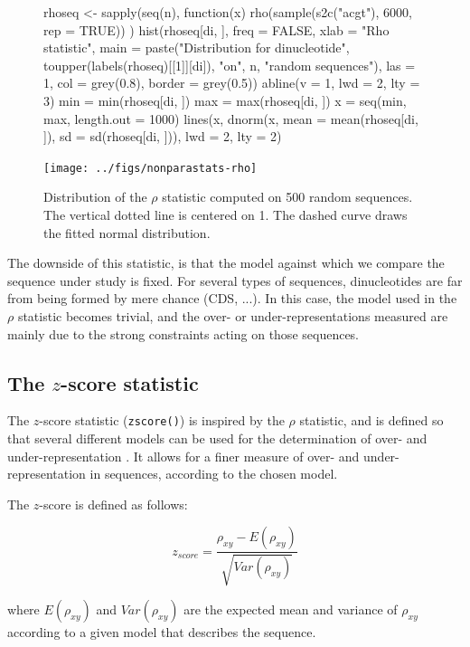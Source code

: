 \documentclass{article}
\begin{document}
\begin{figure}[H]
  \begin{center}
\begin{Schunk}
\begin{Sinput}
 rhoseq <- sapply(seq(n), function(x) {
     rho(sample(s2c("acgt"), 6000, rep = TRUE))
 })
 hist(rhoseq[di, ], freq = FALSE, xlab = "Rho statistic", main = paste("Distribution for dinucleotide", 
     toupper(labels(rhoseq)[[1]][di]), "on", n, "random sequences"), 
     las = 1, col = grey(0.8), border = grey(0.5))
 abline(v = 1, lwd = 2, lty = 3)
 min = min(rhoseq[di, ])
 max = max(rhoseq[di, ])
 x = seq(min, max, length.out = 1000)
 lines(x, dnorm(x, mean = mean(rhoseq[di, ]), sd = sd(rhoseq[di, 
     ])), lwd = 2, lty = 2)
\end{Sinput}
\end{Schunk}
\texttt{[image: ../figs/nonparastats-rho]}
\end{center}
   \caption{Distribution of the $\rho$ statistic computed on
     500 random sequences. The vertical
     dotted line is centered on 1. The dashed curve draws the fitted normal
     distribution.}
   \label{rho}
   \end{figure}

The downside of this statistic, is that the model against which we
compare the sequence under study is fixed. For several types of
sequences, dinucleotides are far from being formed by mere chance
(CDS, ...). In this case, the model used in the $\rho$ statistic
becomes trivial, and the over- or under-representations measured are
mainly due to the strong constraints acting on those sequences.

\subsection{The $z$-score statistic}

The $z$-score statistic (\texttt{zscore()}) is inspired by the
$\rho$ statistic, and is defined so that several different models can
be used for the determination of over- and under-representation
\cite{UV}. It allows for a finer measure of over- and
under-representation in sequences, according to the chosen model.

The $z$-score is defined as follows:

$$z_{score}=\frac{\rho_{xy}-E(\rho_{xy})}{\sqrt{Var(\rho_{xy})}}$$

where $E(\rho_{xy})$ and $Var(\rho_{xy})$ are the expected mean and
variance of $\rho_{xy}$ according to a given model that describes the
sequence.
\end{document}
